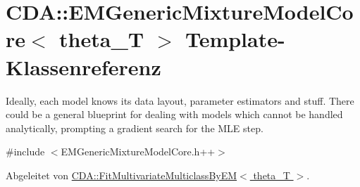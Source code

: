 \hypertarget{classCDA_1_1EMGenericMixtureModelCore}{
\section{CDA::EMGenericMixtureModelCore$<$ theta\_\-T $>$ Template-\/Klassenreferenz}
\label{classCDA_1_1EMGenericMixtureModelCore}
}


Ideally, each model knows its data layout, parameter estimators and stuff. There could be a general blueprint for dealing with models which cannot be handled analytically, prompting a gradient search for the MLE step.  




{\ttfamily \#include $<$EMGenericMixtureModelCore.h++$>$}



Abgeleitet von \hyperlink{classCDA_1_1FitMultivariateMulticlassByEM}{CDA::FitMultivariateMulticlassByEM$<$ theta\_\-T $>$}.



